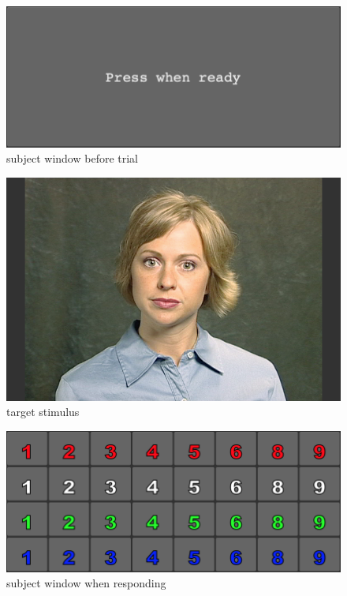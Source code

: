 \documentclass[11pt,pdftex,letterpaper]{article}
\begin{document}
\begin{figure}
\centering
\includegraphics[width = 0.9\linewidth]{subject-ready-window.png}
\caption{subject window before trial}
\label{fig:subject-ready-window}
\end{figure}

\begin{figure}
\centering
\includegraphics[width = 0.9\linewidth]{target-stimulus.png}
\caption{target stimulus}
\label{fig:target-stimulus}
\end{figure}

\begin{figure}
\centering
\includegraphics[width = 0.9\linewidth]{subject-response-window.png}
\caption{subject window when responding}
\label{fig:subject-response-window}
\end{figure}
\end{document}
